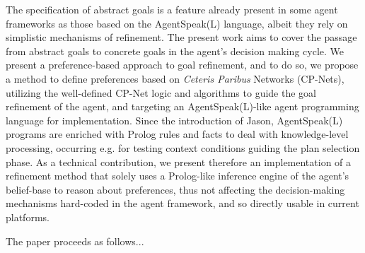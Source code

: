 \documentclass[sigconf,anonymous]{aamas}
\begin{document}
The specification of abstract goals is a feature already present in some agent frameworks as those based on the AgentSpeak(L) language, albeit they rely on simplistic mechanisms of refinement. The present work aims to cover the passage from abstract goals to concrete goals in the agent's decision making cycle. 
We present a preference-based approach to goal refinement, and to do so, we propose a method to define preferences based on \textit{Ceteris Paribus} Networks (CP-Nets), utilizing the well-defined CP-Net logic and algorithms to guide the goal refinement of the agent, and targeting an AgentSpeak(L)-like agent programming language for implementation. Since the introduction of Jason,  AgentSpeak(L) programs are enriched with Prolog rules and facts to deal with knowledge-level processing, occurring e.g. for testing context conditions guiding the plan selection phase. As a technical contribution, we present therefore an implementation of a refinement method that solely uses a Prolog-like inference engine of the agent's belief-base to reason about preferences, thus %
not affecting the decision-making mechanisms hard-coded in the agent framework, and so directly usable in current platforms. 

The paper proceeds as follows... 
\end{document}
